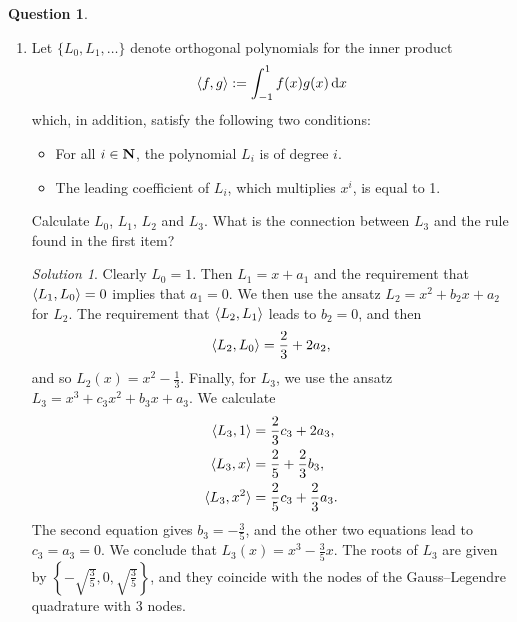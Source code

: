 \documentclass[11pt]{article}
\theoremstyle{definition}
\newtheorem{question}{Question}
\theoremstyle{remark}
\newtheorem*{solution}{Solution}
\begin{document}
\begin{question}
\begin{enumerate}
        \item
            Let $\{L_0, L_1, \dotsc\}$ denote orthogonal polynomials for the inner product
            \[
                \langle f, g\rangle := \int_{-1}^{1} f(x) g(x) \, \mathrm d x
            \]
            which, in addition, satisfy the following two conditions:
            \begin{itemize}
                \item
                    For all $i \in \mathbf N$,
                    the polynomial $L_i$ is of degree $i$.

                \item
                    The leading coefficient of $L_i$,
                    which multiplies $x^i$,
                    is equal to 1.
            \end{itemize}
            Calculate $L_0$, $L_1$, $L_2$ and $L_3$.
            What is the connection between $L_3$ and the rule found in the first item?

            \begin{solution}
                Clearly $L_0 = 1$.
                Then $L_1 = x + a_1$ and the requirement that $\langle L_1, L_0\rangle = 0$ implies that $a_1 = 0$.
                We then use the ansatz $L_2 = x^2 + b_2 x + a_2$ for $L_2$.
                The requirement that $\langle L_2, L_1\rangle$ leads to $b_2 = 0$, and then
                \[
                    \langle L_2, L_0\rangle = \frac{2}{3} + 2 a_2,
                \]
                and so $L_2(x) = x^2 - \frac{1}{3}$.
                Finally, for $L_3$, we use the ansatz $L_3 = x^3 + c_3 x^2 + b_3 x + a_3$.
                We calculate
                \begin{align*}
                    \langle L_3, 1\rangle &= \frac{2}{3} c_3 + 2 a_3, \\
                    \langle L_3, x\rangle &= \frac{2}{5} + \frac{2}{3} b_3, \\
                    \langle L_3, x^2\rangle &= \frac{2}{5} c_3 + \frac{2}{3} a_3.
                \end{align*}
                The second equation gives $b_3 = - \frac{3}{5}$,
                and the other two equations lead to $c_3 = a_3 = 0$. 
                We conclude that $L_3(x) = x^3 - \frac{3}{5}  x$.
                The roots of $L_3$ are given by $\left\{- \sqrt{\frac{3}{5}}, 0, \sqrt{\frac{3}{5}} \right\}$,
                and they coincide with the nodes of the Gauss--Legendre quadrature with 3 nodes.
            \end{solution}


\end{enumerate}
\end{question}
\end{document}
